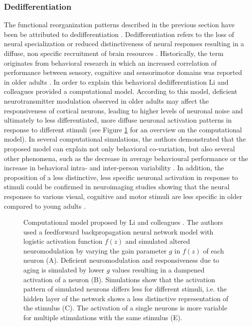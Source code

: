 \subsubsection{Dedifferentiation}
\label{theory:aging:dedif}
The functional reorganization patterns described in the previous section have been be attributed to dedifferentiation \cite{Grady2012}. Dedifferentiation refers to the loss of neural specialization or reduced distinctiveness of neural responses resulting in a diffuse, non specific recruitment of brain resources \cite{Koen2019}. Historically, the term originates from behavioral research in which an increased correlation of performance between sensory, cognitive and sensorimotor domains was reported in older adults \cite{Baltes1997,Li2002}. In order to explain this behavioral dedifferentiation Li and colleagues \cite{Li2001, Li2002} provided a computational model. According to this model, deficient neurotransmitter modulation observed in older adults may affect the responsiveness of cortical neurons, leading to higher levels of neuronal noise and ultimately to less differentiated, more diffuse neuronal activation patterns in response to different stimuli \cite{Li2001,Li2002} (see Figure \ref{fig:dedifferentiation} for an overview on the computational model). In several computational simulations, the authors demonstrated that the proposed model can explain not only behavioral co-variation, but also several other phenomena, such as the decrease in average behavioural performance or the increase in behavioral intra- and inter-person variability \cite{Li2000,Li2002}. In addition, the proposition of a less distinctive, less specific neuronal activation in response to stimuli could be confirmed in neuroimaging studies showing that the neural responses to various visual, cognitive and motor stimuli are less specific in older compared to young adults \cite{Tucker2019, Koen2019,Carb2011}. 

\begin{figure}[h]
\def\svgwidth{\columnwidth}

\caption{Computational model proposed by Li and colleagues \cite{Li2000,Li2002}. The authors used a feedforward backpropagation neural network model with logistic activation function $f(z)$ and simulated altered neuromodulation by varying the gain parameter $g$ in $f(z)$ of each neuron (A). Deficient neuromodulation and responsiveness due to aging is simulated by lower $g$ values resulting in a dampened activation of a neuron (B). Simulations show that the activation pattern of simulated neurons differs less for different stimuli, i.e. the hidden layer of the network shows a less distinctive representation of the stimulus (C). The activation of a single neurons is more variable for multiple stimulations with the same stimulus (E).}
\label{fig:dedifferentiation}
\end{figure}


